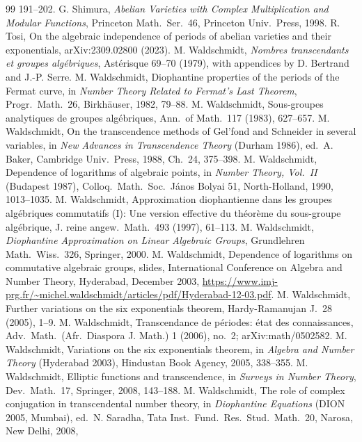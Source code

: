 \documentclass[11pt]{amsart}
\theoremstyle{definition}
\begin{document}
\begin{thebibliography}{99}
191--202.
 G. Shimura, \emph{Abelian Varieties with Complex Multiplication and Modular Functions}, Princeton Math.\
Ser.\ 46, Princeton Univ.\ Press, 1998.
 R. Tosi, On the algebraic independence of periods of abelian varieties and their exponentials,
arXiv:2309.02800 (2023).
 M. Waldschmidt, \emph{Nombres transcendants et groupes alg\'ebriques}, Ast\'erisque 69--70 (1979), with
appendices by D. Bertrand and J.-P. Serre.
 M. Waldschmidt, Diophantine properties of the periods of the Fermat curve, in \emph{Number Theory
Related to Fermat's Last Theorem}, Progr.\ Math.\ 26, Birkh\"auser, 1982, 79--88.
\bibitem{W83} M. Waldschmidt, Sous-groupes analytiques de groupes alg\'ebriques, Ann.\ of Math.\ 117 (1983), 627--657.
\bibitem{W88} M. Waldschmidt, On the transcendence methods of Gel'fond and Schneider in several variables, in \emph{New
Advances in Transcendence Theory} (Durham 1986), ed.\ A. Baker, Cambridge Univ.\ Press, 1988, Ch.~24, 375--398.
\bibitem{W90} M. Waldschmidt, Dependence of logarithms of algebraic points, in \emph{Number Theory, Vol.~II} (Budapest
1987), Colloq.\ Math.\ Soc.\ J\'anos Bolyai 51, North-Holland, 1990, 1013--1035.
\bibitem{W97} M. Waldschmidt, Approximation diophantienne dans les groupes alg\'ebriques commutatifs (I): Une version
effective du th\'eor\`eme du sous-groupe alg\'ebrique, J. reine angew.\ Math.\ 493 (1997), 61--113.
\bibitem{W00} M. Waldschmidt, \emph{Diophantine Approximation on Linear Algebraic Groups}, Grundlehren Math.\ Wiss.\ 326,
Springer, 2000.
 M. Waldschmidt, Dependence of logarithms on commutative algebraic groups, slides, International
Conference on Algebra and Number Theory, Hyderabad, December 2003,
\url{https://www.imj-prg.fr/~michel.waldschmidt/articles/pdf/Hyderabad-12-03.pdf}.
\bibitem{W05b} M. Waldschmidt, Further variations on the six exponentials theorem, Hardy-Ramanujan J.\ 28 (2005), 1--9.
\bibitem{Wper05} M. Waldschmidt, Transcendance de p\'eriodes: \'etat des connaissances, Adv.\ Math.\ (Afr.\ Diaspora
J. Math.) 1 (2006), no.~2; arXiv:math/0502582.
 M. Waldschmidt, Variations on the six exponentials theorem, in \emph{Algebra and Number Theory}
(Hyderabad 2003), Hindustan Book Agency, 2005, 338--355.
 M. Waldschmidt, Elliptic functions and transcendence, in \emph{Surveys in Number Theory}, Dev.\ Math.\ 17,
Springer, 2008, 143--188.
 M. Waldschmidt, The role of complex conjugation in transcendental number theory, in \emph{Diophantine
Equations} (DION 2005, Mumbai), ed.\ N. Saradha, Tata Inst.\ Fund.\ Res.\ Stud.\ Math.\ 20, Narosa, New Delhi, 2008,

\end{thebibliography}
\end{document}
